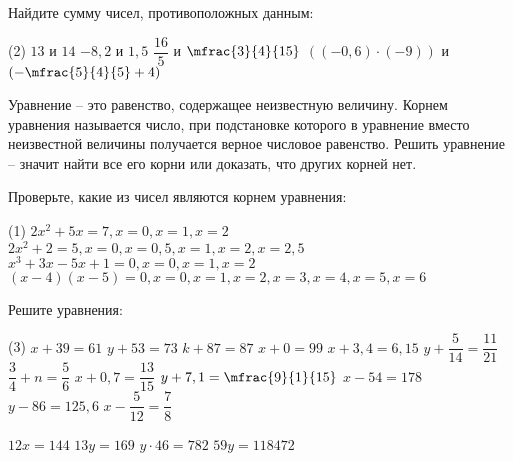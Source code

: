 %
%

\begin{class}[number=1-2]
	\begin{listofex}
		\item Найдите сумму чисел, противоположных данным:
		\begin{tasks}(2)
			\task \( 13  \) и \( 14 \)
			\task \( -8,2  \) и \( 1,5 \)
			\task \( \dfrac{16}{5}  \) и \( \mfrac{3}{4}{15} \)
			\task \( ((-0,6) \cdot (-9))  \) и \( \left(-\mfrac{5}{4}{5}+4\right) \)
		\end{tasks}
		
	\end{listofex}
	\begin{definit}
		Уравнение – это равенство, содержащее неизвестную величину. Корнем уравнения называется число, при подстановке которого в уравнение вместо неизвестной величины получается верное числовое равенство. Решить уравнение – значит найти все его корни или доказать, что других корней нет.
	\end{definit}
	\begin{listofex}[resume]
		\item Проверьте, какие из чисел являются корнем уравнения:
		\begin{tasks}(1)
			\task \( 2x^2+5x=7, x=0, x=1, x=2 \)
			\task \( 2x^2+2=5, x=0, x=0,5, x=1, x=2, x=2,5 \)
			\task \( x^3 +3x-5x+1=0, x=0, x=1, x=2 \)
			\task \( (x-4)(x-5)=0, x=0, x=1, x=2, x=3, x=4, x=5, x=6 \)
		\end{tasks}
		\item Решите уравнения: %
		\begin{tasks}(3)
			\task \( x+39=61 \)
			\task \( y+53=73 \)
			\task \( k+87=87 \)
			\task \( x+0=99 \)
			\task \( x+3,4=6,15 \)
			\task \( y+\dfrac{5}{14}=\dfrac{11}{21} \)
			\task \( \dfrac{3}{4}+n=\dfrac{5}{6} \)
			\task \( x+0,7=\dfrac{13}{15} \)
			\task \( y+7,1=\mfrac{9}{1}{15} \)
			\task \( x-54=178 \)
			\task \( y-86=125,6 \)
			\task \( x-\dfrac{5}{12}=\dfrac{7}{8} \)
			
			
			\task \( 12x=144 \)
			\task \( 13y=169 \)
			\task \( y \cdot 46=782 \)
			\task \( 59y=118472 \)
			

\end{tasks}
\end{listofex}
\end{class}

